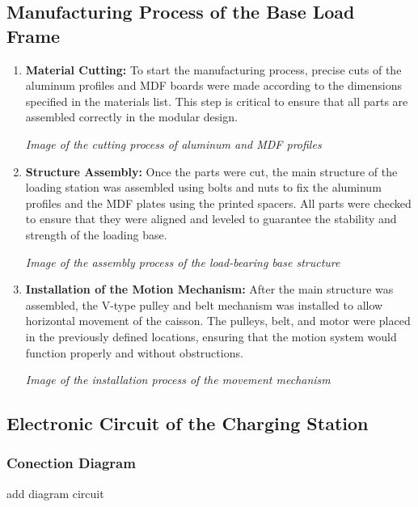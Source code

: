 \subsection{Manufacturing Process of the Base Load Frame}

    \begin{enumerate}
        \item \textbf{Material Cutting:}  To start the manufacturing process, precise cuts of the aluminum profiles and MDF boards were made according to the dimensions specified in the materials list. This step is critical to ensure that all parts are assembled correctly in the modular design.
            \begin{center}
                \textit{Image of the cutting process of aluminum and MDF profiles}
            \end{center}
        \item \textbf{Structure Assembly:} Once the parts were cut, the main structure of the loading station was assembled using bolts and nuts to fix the aluminum profiles and the MDF plates using the printed spacers. All parts were checked to ensure that they were aligned and leveled to guarantee the stability and strength of the loading base.
        \begin{center}
                \textit{Image of the assembly process of the load-bearing base structure}
            \end{center}
        \item \textbf{Installation of the Motion Mechanism:} After the main structure was assembled, the V-type pulley and belt mechanism was installed to allow horizontal movement of the caisson. The pulleys, belt, and motor were placed in the previously defined locations, ensuring that the motion system would function properly and without obstructions.
        \begin{center}
                \textit{Image of the installation process of the movement mechanism}
            \end{center}
        
    \end{enumerate}



    \subsection{Electronic Circuit of the Charging Station}

    \subsubsection{Conection Diagram}
    add diagram circuit
    
